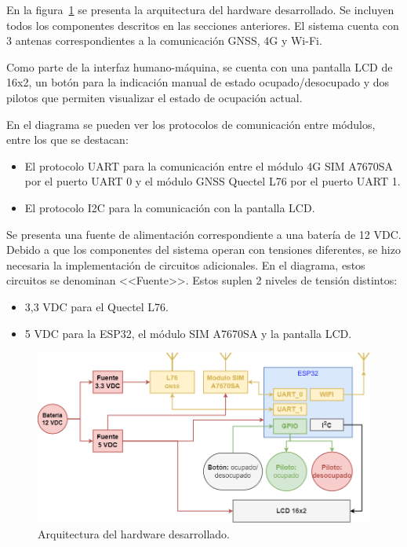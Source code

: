 En la figura~\ref{fig:Arq_harware} se presenta la arquitectura del hardware desarrollado. Se incluyen todos los componentes descritos en las secciones anteriores. El sistema cuenta con 3 antenas correspondientes a la comunicación GNSS, 4G y Wi-Fi. 

Como parte de la interfaz humano-máquina, se cuenta con una pantalla LCD de 16x2, un botón para la indicación manual de estado ocupado/desocupado y dos pilotos que permiten visualizar el estado de ocupación actual. 

En el diagrama se pueden ver los protocolos de comunicación entre módulos, entre los que se destacan:

\begin{itemize}
    \item El protocolo UART para la comunicación entre el módulo 4G SIM A7670SA por el puerto UART 0 y el módulo  GNSS Quectel L76 por el puerto UART 1. 
    \item El protocolo I2C para la comunicación con la pantalla LCD. 
\end{itemize}

Se presenta una fuente de alimentación correspondiente a una batería de 12 VDC. Debido a que los componentes del sistema operan con tensiones diferentes, se hizo necesaria la implementación de circuitos adicionales. En el diagrama, estos circuitos se denominan <<Fuente>>. Estos suplen 2 niveles de tensión distintos: 
\begin{itemize}
    \item 3,3 VDC para el Quectel L76.
    \item 5 VDC para la ESP32, el módulo SIM A7670SA y la pantalla LCD.
\end{itemize}



\begin{figure}[htbp]
	\centering
	\includegraphics[width=1\textwidth]{./Figures/arquitectura_hardware_sistema.png}
	\caption{Arquitectura del hardware desarrollado.}
	\label{fig:Arq_harware}
\end{figure}



